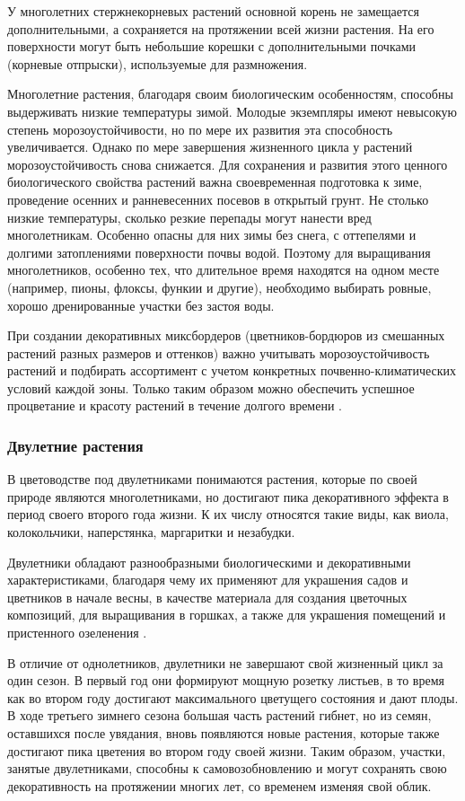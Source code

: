 У многолетних стержнекорневых растений основной корень не замещается дополнительными, а сохраняется на протяжении всей жизни растения. На его поверхности могут быть небольшие корешки с дополнительными почками (корневые отпрыски), используемые для размножения.

Многолетние растения, благодаря своим биологическим особенностям, способны выдерживать низкие температуры зимой. Молодые экземпляры имеют невысокую степень морозоустойчивости, но по мере их развития эта способность увеличивается. Однако по мере завершения жизненного цикла у растений морозоустойчивость снова снижается. Для сохранения и развития этого ценного биологического свойства растений важна своевременная подготовка к зиме, проведение осенних и ранневесенних посевов в открытый грунт. Не столько низкие температуры, сколько резкие перепады могут нанести вред многолетникам. Особенно опасны для них зимы без снега, с оттепелями и долгими затоплениями поверхности почвы водой. Поэтому для выращивания многолетников, особенно тех, что длительное время находятся на одном месте (например, пионы, флоксы, функии и другие), необходимо выбирать ровные, хорошо дренированные участки без застоя воды.

При создании декоративных миксбордеров (цветников-бордюров из смешанных растений разных размеров и оттенков) важно учитывать морозоустойчивость растений и подбирать ассортимент с учетом конкретных почвенно-климатических условий каждой зоны. Только таким образом можно обеспечить успешное процветание и красоту растений в течение долгого времени \cite{karpisonova}.

\subsubsection{Двулетние растения}

В цветоводстве под двулетниками понимаются растения, которые по своей природе являются многолетниками, но достигают пика декоративного эффекта в период своего второго года жизни. К их числу относятся такие виды, как виола, колокольчики, наперстянка, маргаритки и незабудки.

Двулетники обладают разнообразными биологическими и декоративными характеристиками, благодаря чему их применяют для украшения садов и цветников в начале весны, в качестве материала для создания цветочных композиций, для выращивания в горшках, а также для украшения помещений и пристенного озеленения \cite{aldohinaFlower}.

В отличие от однолетников, двулетники не завершают свой жизненный цикл за один сезон. В первый год они формируют мощную розетку листьев, в то время как во втором году достигают максимального цветущего состояния и дают плоды. В ходе третьего зимнего сезона большая часть растений гибнет, но из семян, оставшихся после увядания, вновь появляются новые растения, которые также достигают пика цветения во втором году своей жизни. Таким образом, участки, занятые двулетниками, способны к самовозобновлению и могут сохранять свою декоративность на протяжении многих лет, со временем изменяя свой облик.

